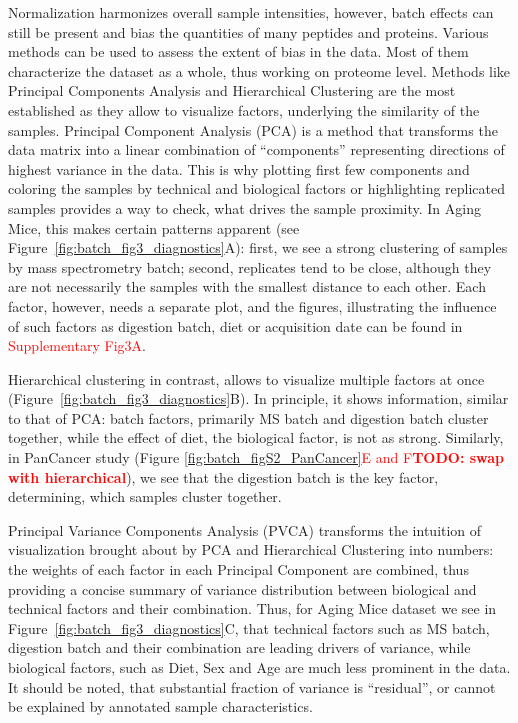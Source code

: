 \documentclass[num-refs]{wiley-article}
\begin{document}
Normalization harmonizes overall sample intensities, however, batch effects can still be present and bias the quantities of many peptides and proteins.
Various methods can be used to assess the extent of bias in the data. Most of them characterize the dataset as a whole, thus working on proteome level. Methods like Principal Components Analysis and Hierarchical Clustering are the most established as they allow to visualize factors, underlying the similarity of the samples.
Principal Component Analysis (PCA) is a method that transforms the data matrix into a linear combination of “components” representing directions of highest variance in the data. This is why plotting first few components and coloring the samples by technical and biological factors or highlighting replicated samples provides a way to check, what drives the sample proximity. In Aging Mice, this makes certain patterns apparent (see Figure~\ref{fig:batch_fig3_diagnostics}A): first, we see a strong clustering of samples by mass spectrometry batch; second, replicates tend to be close, although they are not necessarily the samples with the smallest distance to each other. Each factor, however, needs a separate plot, and the figures, illustrating the influence of such factors as digestion batch, diet or acquisition date can be found in \textcolor{red}{Supplementary Fig3A}.
 
Hierarchical clustering in contrast, allows to visualize multiple factors at once (Figure~\ref{fig:batch_fig3_diagnostics}B). In principle, it shows information, similar to that of PCA: batch factors, primarily MS batch and digestion batch cluster together, while the effect of diet, the biological factor, is not as strong. Similarly, in PanCancer study (Figure \ref{fig:batch_figS2_PanCancer}\textcolor{red}{E and F\textbf{TODO: swap with hierarchical}}), we see that the digestion batch is the key factor, determining, which samples cluster together.

Principal Variance Components Analysis (PVCA) transforms the intuition of visualization brought about by PCA and Hierarchical Clustering into numbers: the weights of each factor in each Principal Component are combined, thus providing a concise summary of variance distribution between biological and technical factors and their combination. Thus, for Aging Mice dataset we see in Figure~\ref{fig:batch_fig3_diagnostics}C, that technical factors such as MS batch, digestion batch and their combination are leading drivers of variance, while biological factors, such as Diet, Sex and Age are much less prominent in the data. It should be noted, that substantial fraction of variance is “residual”, or cannot be explained by annotated sample characteristics.
\end{document}
